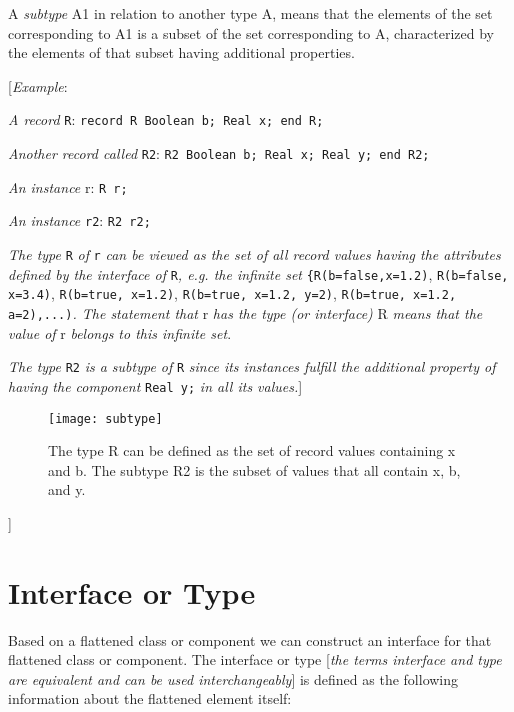 A \emph{subtype} A1 in relation to another type A, means that the
elements of the set corresponding to A1 is a subset of the set
corresponding to A, characterized by the elements of that subset having
additional properties.

{[}\emph{Example}:

\emph{A record} \lstinline[basicstyle=\ttfamily]!R!: \lstinline[basicstyle=\ttfamily]!record R Boolean b; Real x; end R;!

\emph{Another record called} \lstinline[basicstyle=\ttfamily]!R2!: \lstinline[basicstyle=\ttfamily]!R2 Boolean b; Real x; Real y; end R2;!

\emph{An instance} r: \lstinline[basicstyle=\ttfamily]!R r;!

\emph{An instance} \lstinline[basicstyle=\ttfamily]!r2!: \lstinline[basicstyle=\ttfamily]!R2 r2;!

\emph{The type} \lstinline[basicstyle=\ttfamily]!R! \emph{of} \lstinline[basicstyle=\ttfamily]!r! \emph{can be viewed as the set of all
record values having the attributes defined by the interface of}
\lstinline[basicstyle=\ttfamily]!R!\emph{, e.g. the infinite set} \lstinline[basicstyle=\ttfamily]!{R(b=false,x=1.2)!, \lstinline[basicstyle=\ttfamily]!R(b=false, x=3.4)!,
\lstinline[basicstyle=\ttfamily]!R(b=true, x=1.2)!, \lstinline[basicstyle=\ttfamily]!R(b=true, x=1.2, y=2)!, 
\lstinline[basicstyle=\ttfamily]!R(b=true, x=1.2, a=2),...)!\emph{. The statement that} r \emph{has the type (or
interface)} R \emph{means that the value of} r \emph{belongs to this
infinite set}.

\emph{The type} \lstinline[basicstyle=\ttfamily]!R2! \emph{is a subtype of} \lstinline[basicstyle=\ttfamily]!R! \emph{since its instances
fulfill the additional property of having the component} \lstinline[basicstyle=\ttfamily]!Real y;!
\emph{in all its values.}{]}

\begin{figure}[H]
\caption{The type R can be defined as the set of
record values containing x and b. The subtype R2 is the subset of values
that all contain x, b, and y.}
\texttt{[image: subtype]}
\end{figure}
{]}

\section{Interface or Type}

Based on a flattened class or component we can construct an interface
for that flattened class or component. The interface or type
{[}\emph{the terms interface and type are equivalent and can be used
interchangeably}{]} is defined as the following information about the
flattened element itself:

